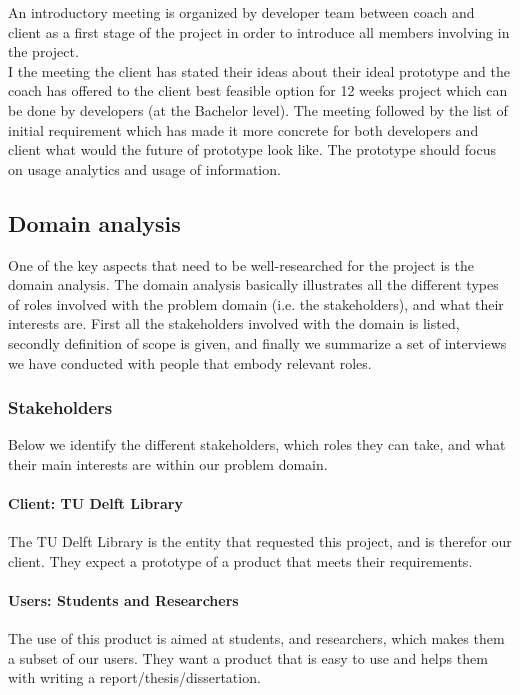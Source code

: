 An introductory meeting is organized by developer team between coach and client as a first stage of the project in order to introduce all members involving in the project.\\
I the meeting the client has stated their ideas about their ideal prototype and the coach has offered to the client best feasible option for 12 weeks project which can be done by developers (at the Bachelor level).
The meeting followed by the list of initial requirement which has made it more concrete for both developers and client what would the future of prototype look like. The prototype should focus on usage analytics and usage of information.\\ 


\subsection{Domain analysis} %

One of the key aspects that need to be well-researched for the project is the domain analysis. The domain analysis basically illustrates all the different types of roles involved with the problem domain (i.e. the stakeholders), and what their interests are. First all the stakeholders involved with the domain is listed, secondly definition of scope is given, and finally we summarize a set of interviews we have conducted with people that embody relevant roles.

\subsubsection{Stakeholders} %

Below we identify the different stakeholders, which roles they can take, and what their main interests are within our problem domain.

\paragraph{Client: TU Delft Library} The TU Delft Library is the entity that requested this project, and is therefor our client. They expect a prototype of a product that meets their requirements.

\paragraph{Users: Students and Researchers} The use of this product is aimed at students, and researchers, which makes them a subset of our users. They want a product that is easy to use and helps them with writing a report/thesis/dissertation.


